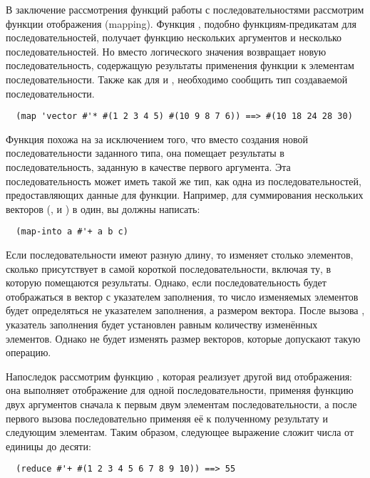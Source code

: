 В заключение рассмотрения функций работы с последовательностями рассмотрим
функции отображения (mapping).  Функция , подобно функциям-предикатам для
последовательностей, получает функцию нескольких аргументов и несколько
последовательностей.  Но вместо логического значения  возвращает новую
последовательность, содержащую результаты применения функции к элементам
последовательности.  Также как для  и , 
необходимо сообщить тип создаваемой последовательности.

\begin{verbatim}
  (map 'vector #'* #(1 2 3 4 5) #(10 9 8 7 6)) ==> #(10 18 24 28 30)
\end{verbatim}

Функция  похожа на  за исключением того, что вместо создания
новой последовательности заданного типа, она помещает результаты в последовательность,
заданную в качестве первого аргумента.  Эта последовательность может иметь такой же тип,
как одна из последовательностей, предоставляющих данные для функции.  Например, для
суммирования нескольких векторов (,  и ) в один, вы должны
написать:

\begin{verbatim}
  (map-into a #'+ a b c)
\end{verbatim}

Если последовательности имеют разную длину, то  изменяет столько элементов,
сколько присутствует в самой короткой последовательности, включая ту, в которую помещаются
результаты.  Однако, если последовательность будет отображаться в вектор с указателем
заполнения, то число изменяемых элементов будет определяться не указателем заполнения, а
размером вектора.  После вызова , указатель заполнения будет установлен
равным количеству изменённых элементов. Однако  не будет изменять размер
векторов, которые допускают такую операцию.

Напоследок рассмотрим функцию ,
которая реализует другой вид отображения: она выполняет отображение для
одной последовательности, применяя функцию двух аргументов сначала к первым двум элементам
последовательности, а после первого вызова последовательно применяя её к полученному
результату и следующим элементам.  Таким образом, следующее выражение сложит числа от
единицы до десяти:

\begin{verbatim}
  (reduce #'+ #(1 2 3 4 5 6 7 8 9 10)) ==> 55
\end{verbatim}

